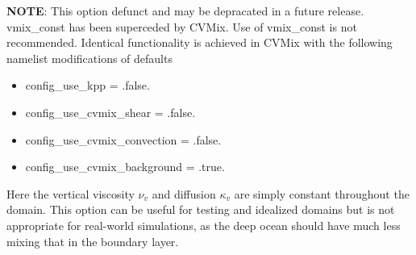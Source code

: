 \textbf{NOTE}: This option defunct and may be depracated in a future release.  vmix\_const has been superceded by CVMix.  Use of vmix\_const is not recommended.  Identical functionality is achieved in CVMix with the following namelist modifications of defaults
\begin{itemize}
	\item config\_use\_kpp = .false.
	\item config\_use\_cvmix\_shear = .false.
	\item config\_use\_cvmix\_convection = .false.
	\item config\_use\_cvmix\_background = .true.
\end{itemize} 

Here the vertical viscosity $\nu_v$ and diffusion $\kappa_v$ are simply constant throughout the domain.  This option can be useful for testing and idealized domains but is not appropriate for real-world simulations, as the deep ocean should have much less mixing that in the boundary layer.

